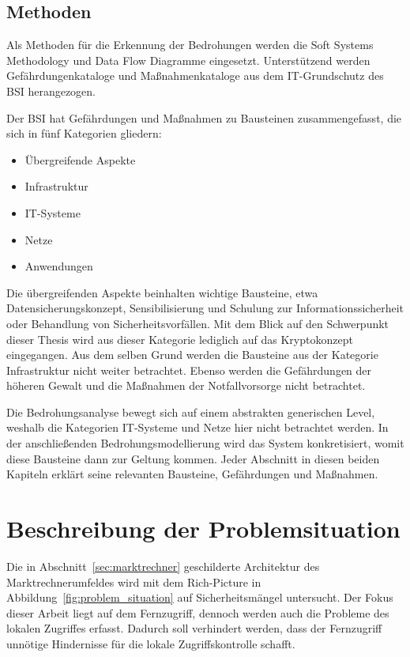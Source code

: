 \documentclass[11pt,a4paper]{report}
\begin{document}
\subsection{Methoden}

Als Methoden für die Erkennung der Bedrohungen werden die Soft Systems Methodology und Data Flow Diagramme eingesetzt. Unterstützend werden Gefährdungenkataloge und Maßnahmenkataloge aus dem IT-Grundschutz des BSI herangezogen. 

Der BSI hat Gefährdungen und Maßnahmen zu Bausteinen zusammengefasst, die sich in fünf Kategorien gliedern:

\begin{itemize}
\item Übergreifende Aspekte
\item Infrastruktur 
\item IT-Systeme
\item Netze 
\item Anwendungen
\end{itemize} 

Die übergreifenden Aspekte beinhalten wichtige Bausteine, etwa Datensicherungskonzept, Sensibilisierung und Schulung zur Informationssicherheit oder Behandlung von Sicherheitsvorfällen. Mit dem Blick auf den Schwerpunkt dieser Thesis wird aus dieser Kategorie lediglich auf das Kryptokonzept eingegangen. Aus dem selben Grund werden die Bausteine aus der Kategorie Infrastruktur nicht weiter betrachtet. Ebenso werden die Gefährdungen der höheren Gewalt und die Maßnahmen der Notfallvorsorge nicht betrachtet.

Die Bedrohungsanalyse bewegt sich auf einem abstrakten generischen Level, weshalb die Kategorien IT-Systeme und Netze hier nicht betrachtet werden. In der anschließenden Bedrohungsmodellierung wird das System konkretisiert, womit diese Bausteine dann zur Geltung kommen. Jeder Abschnitt in diesen beiden Kapiteln erklärt seine relevanten Bausteine, Gefährdungen und Maßnahmen.

\section{Beschreibung der Problemsituation} \label{sec:problem_situation}

Die in Abschnitt~\ref{sec:marktrechner} geschilderte Architektur des Marktrechnerumfeldes wird mit dem Rich-Picture in Abbildung~\ref{fig:problem_situation} auf Sicherheitsmängel untersucht. Der Fokus dieser Arbeit liegt auf dem Fernzugriff, dennoch werden auch die Probleme des lokalen Zugriffes erfasst. Dadurch soll verhindert werden, dass der Fernzugriff unnötige Hindernisse für die lokale Zugriffskontrolle schafft. 
\end{document}
